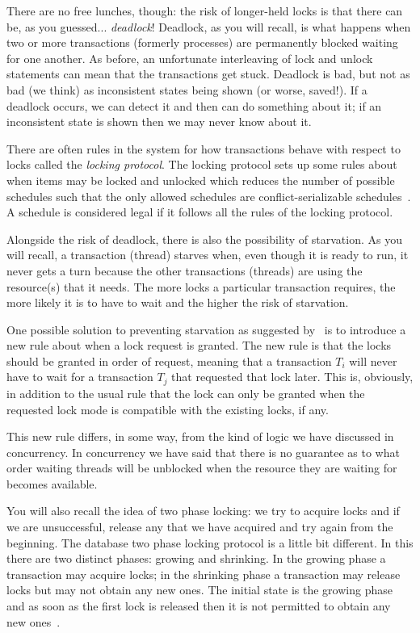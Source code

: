 There are no free lunches, though: the risk of longer-held locks is that there can be, as you guessed... \textit{deadlock}! Deadlock, as you will recall, is what happens when two or more transactions (formerly processes) are permanently blocked waiting for one another. As before, an unfortunate interleaving of lock and unlock statements can mean that the transactions get stuck. Deadlock is bad, but not as bad (we think) as inconsistent states being shown (or worse, saved!). If a deadlock occurs, we can detect it and then can do something about it; if an inconsistent state is shown then we may never know about it.

There are often rules in the system for how transactions behave with respect to locks called the \textit{locking protocol}. The locking protocol sets up some rules about when items may be locked and unlocked which reduces the number of possible schedules such that the only allowed schedules are conflict-serializable schedules~\cite{dsc}. A schedule is considered legal if it follows all the rules of the locking protocol.

Alongside the risk of deadlock, there is also the possibility of starvation. As you will recall, a transaction (thread) starves when, even though it is ready to run, it never gets a turn because the other transactions (threads) are using the resource(s) that it needs. The more locks a particular transaction requires, the more likely it is to have to wait and the higher the risk of starvation. 

One possible solution to preventing starvation as suggested by~\cite{dsc} is to introduce a new rule about when a lock request is granted. The new rule is that the locks should be granted in order of request, meaning that a transaction $T_{i}$ will never have to wait for a transaction $T_{j}$ that requested that lock later. This is, obviously, in addition to the usual rule that the lock can only be granted when the requested lock mode is compatible with the existing locks, if any. 

This new rule differs, in some way, from the kind of logic we have discussed in concurrency. In concurrency we have said that there is no guarantee as to what order waiting threads will be unblocked when the resource they are waiting for becomes available. 

You will also recall the idea of two phase locking: we try to acquire locks and if we are unsuccessful, release any that we have acquired and try again from the beginning. The database two phase locking protocol is a little bit different. In this there are two distinct phases: growing and shrinking. In the growing phase a transaction may acquire locks; in the shrinking phase a transaction may release locks but may not obtain any new ones. The initial state is the growing phase and as soon as the first lock is released then it is not permitted to obtain any new ones~\cite{dsc}.

